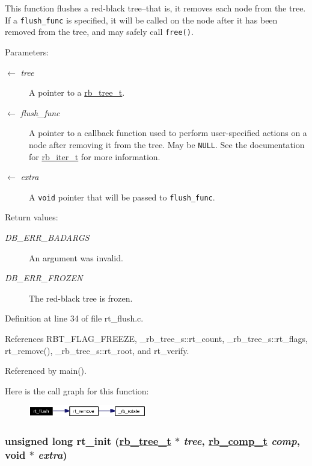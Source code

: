 This function flushes a red-black tree--that is, it removes each node from the tree. If a {\tt flush\_\-func} is specified, it will be called on the node after it has been removed from the tree, and may safely call {\tt free()}.

\begin{Desc}
\item[Parameters:]
\begin{description}
\item[\mbox{$\leftarrow$} {\em tree}]A pointer to a \hyperlink{group__dbprim__rbtree_ga0}{rb\_\-tree\_\-t}. \item[\mbox{$\leftarrow$} {\em flush\_\-func}]A pointer to a callback function used to perform user-specified actions on a node after removing it from the tree. May be {\tt NULL}. See the documentation for \hyperlink{group__dbprim__rbtree_ga2}{rb\_\-iter\_\-t} for more information. \item[\mbox{$\leftarrow$} {\em extra}]A {\tt void} pointer that will be passed to {\tt flush\_\-func}.\end{description}
\end{Desc}
\begin{Desc}
\item[Return values:]
\begin{description}
\item[{\em DB\_\-ERR\_\-BADARGS}]An argument was invalid. \item[{\em DB\_\-ERR\_\-FROZEN}]The red-black tree is frozen.\end{description}
\end{Desc}


Definition at line 34 of file rt\_\-flush.c.

References RBT\_\-FLAG\_\-FREEZE, \_\-rb\_\-tree\_\-s::rt\_\-count, \_\-rb\_\-tree\_\-s::rt\_\-flags, rt\_\-remove(), \_\-rb\_\-tree\_\-s::rt\_\-root, and rt\_\-verify.

Referenced by main().

Here is the call graph for this function:\begin{figure}[H]
\begin{center}
\leavevmode
\includegraphics[width=146pt]{group__dbprim__rbtree_ga12_cgraph}
\end{center}
\end{figure}
\hypertarget{group__dbprim__rbtree_ga5}{
\subsubsection[rt\_\-init]{\setlength{\rightskip}{0pt plus 5cm}unsigned long rt\_\-init (\hyperlink{struct__rb__tree__s}{rb\_\-tree\_\-t} $\ast$ {\em tree}, \hyperlink{group__dbprim__rbtree_ga3}{rb\_\-comp\_\-t} {\em comp}, void $\ast$ {\em extra})}}
\label{group__dbprim__rbtree_ga5}


